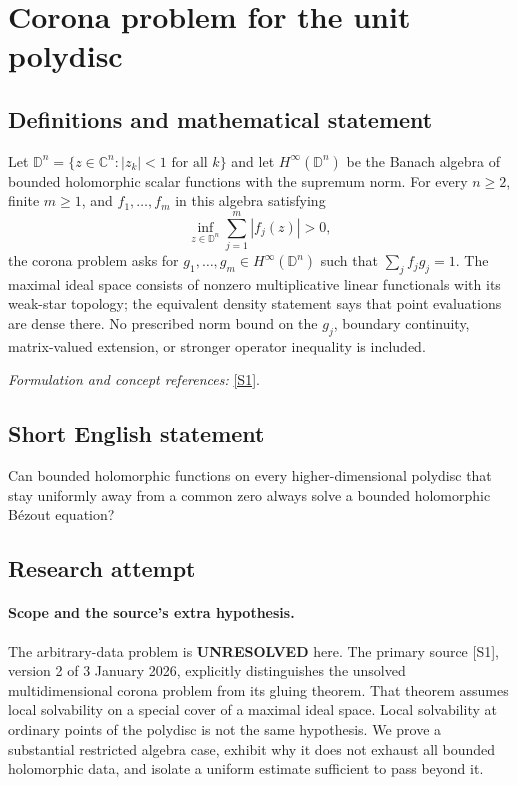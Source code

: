 \documentclass[11pt]{article}
\begin{document}
\section*{\texorpdfstring{Corona problem for the unit polydisc}{Corona problem for the unit polydisc}}\label{30006876}
\subsection{Definitions and mathematical statement}
Let $\mathbb D^n=\{z\in{\mathbb{C}}^n:|z_k|<1\text{ for all }k\}$ and let $H^\infty(\mathbb D^n)$ be the Banach algebra of bounded holomorphic scalar functions with the supremum norm. For every $n\ge2$, finite $m\ge1$, and $f_1,\ldots,f_m$ in this algebra satisfying
\[
 \inf_{z\in\mathbb D^n}\sum_{j=1}^m|f_j(z)|>0,
\]
the corona problem asks for $g_1,\ldots,g_m\in H^\infty(\mathbb D^n)$ such that $\sum_jf_jg_j=1$. The maximal ideal space consists of nonzero multiplicative linear functionals with its weak-star topology; the equivalent density statement says that point evaluations are dense there. No prescribed norm bound on the $g_j$, boundary continuity, matrix-valued extension, or stronger operator inequality is included.
\par\smallskip\textit{Formulation and concept references:} \href{https://arxiv.org/pdf/2512.23733v2}{[S1]}.

\subsection{Short English statement}
Can bounded holomorphic functions on every higher-dimensional polydisc that stay uniformly away from a common zero always solve a bounded holomorphic B\'ezout equation?
\subsection{Research attempt}
\paragraph{Scope and the source's extra hypothesis.}
The arbitrary-data problem is \textbf{UNRESOLVED} here. The primary
source [S1], version 2 of 3 January 2026, explicitly distinguishes
the unsolved multidimensional corona problem from its gluing theorem.
That theorem assumes local solvability on a special cover of a maximal
ideal space. Local solvability at ordinary points of the polydisc is
not the same hypothesis. We prove a substantial restricted algebra
case, exhibit why it does not exhaust all bounded holomorphic data,
and isolate a uniform estimate sufficient to pass beyond it.
\end{document}
